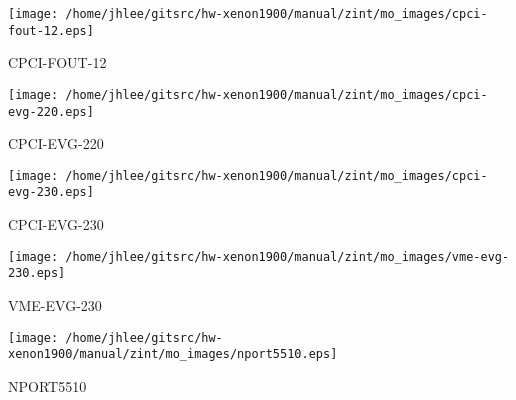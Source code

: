 \noindent
\vspace{1cm}
\begin{minipage}{.2\textwidth}
\begin{center}
\texttt{[image: /home/jhlee/gitsrc/hw-xenon1900/manual/zint/mo\_images/cpci-fout-12.eps]}
\end{center}
\end{minipage}
\begin{minipage}{.7\textwidth}
CPCI-FOUT-12
\end{minipage}


\noindent
\vspace{1cm}
\begin{minipage}{.2\textwidth}
\begin{center}
\texttt{[image: /home/jhlee/gitsrc/hw-xenon1900/manual/zint/mo\_images/cpci-evg-220.eps]}
\end{center}
\end{minipage}
\begin{minipage}{.7\textwidth}
CPCI-EVG-220
\end{minipage}


\noindent
\vspace{1cm}
\begin{minipage}{.2\textwidth}
\begin{center}
\texttt{[image: /home/jhlee/gitsrc/hw-xenon1900/manual/zint/mo\_images/cpci-evg-230.eps]}
\end{center}
\end{minipage}
\begin{minipage}{.7\textwidth}
CPCI-EVG-230
\end{minipage}


\noindent
\vspace{1cm}
\begin{minipage}{.2\textwidth}
\begin{center}
\texttt{[image: /home/jhlee/gitsrc/hw-xenon1900/manual/zint/mo\_images/vme-evg-230.eps]}
\end{center}
\end{minipage}
\begin{minipage}{.7\textwidth}
VME-EVG-230
\end{minipage}


\noindent
\vspace{1cm}
\begin{minipage}{.2\textwidth}
\begin{center}
\texttt{[image: /home/jhlee/gitsrc/hw-xenon1900/manual/zint/mo\_images/nport5510.eps]}
\end{center}
\end{minipage}
\begin{minipage}{.7\textwidth}
NPORT5510
\end{minipage}


